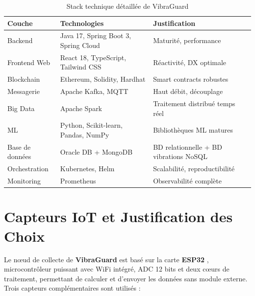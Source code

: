 \documentclass[12pt, a4paper, oneside]{report}
\newcommand{\projectname}{\textbf{VibraGuard}}
\begin{document}
\begin{table}[H]
  \centering
  \begin{tabularx}{\textwidth}{L{2.5cm} L{4.5cm} L{4cm}}
    \toprule
    \textbf{Couche} &
    \textbf{Technologies} &
    \textbf{Justification} \\
    \midrule
    Backend & Java 17, Spring Boot 3, Spring Cloud & Maturité, performance \\
    Frontend Web & React 18, TypeScript, Tailwind CSS & Réactivité, DX optimale \\
    Blockchain & Ethereum, Solidity, Hardhat & Smart contracts robustes \\
    Messagerie & Apache Kafka, MQTT & Haut débit, découplage \\
    Big Data & Apache Spark & Traitement distribué temps réel \\
    ML & Python, Scikit-learn, Pandas, NumPy & Bibliothèques ML matures \\
    Base de données & Oracle DB + MongoDB & BD relationnelle + BD vibrations NoSQL \\
    Orchestration & Kubernetes, Helm & Scalabilité, reproductibilité \\
    Monitoring & Prometheus & Observabilité complète \\
    \bottomrule
  \end{tabularx}
  \caption{Stack technique détaillée de VibraGuard}
\end{table}

\section{Capteurs IoT et Justification des Choix}

Le nœud de collecte de \projectname{} est basé sur la carte \textbf{ESP32} \cite{espressif2024}, microcontrôleur
puissant avec WiFi intégré, ADC 12 bits et deux cœurs de traitement, permettant de calculer
et d'envoyer les données sans module externe. Trois capteurs complémentaires sont utilisés :
\end{document}
